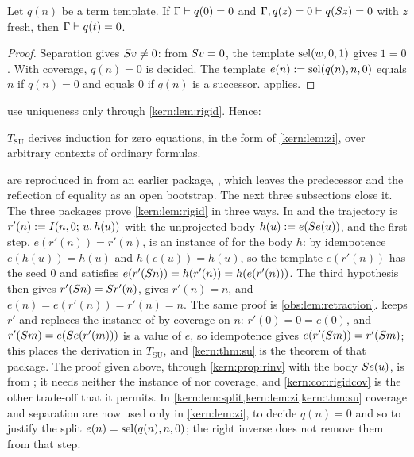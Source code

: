 \begin{lemma}
\label{kern:lem:zi}
Let $q(n)$ be a term template.  If $\Gamma\vdash q(0)=0$ and
$\Gamma,q(z)=0\vdash q(S z)=0$ with $z$ fresh, then
$\Gamma\vdash q(t)=0$.
\end{lemma}

\begin{proof}
Separation gives $S v\neq 0$: from $S v=0$, the template
$\operatorname{sel}(w,0,1)$ gives $1=0$.  With coverage, $q(n)=0$ is decided.  The
template $e(n)\mathrel{:=}\operatorname{sel}(q(n),n,0)$ equals $n$ if $q(n)=0$ and equals $0$
if $q(n)$ is a successor.   applies.
\end{proof}

 use uniqueness only through
\cref{kern:lem:rigid}.  Hence:

\begin{theorem}
\label{kern:thm:su}
$T_{\mathrm{SU}}$ derives induction for zero equations, in the form of
\cref{kern:lem:zi}, over arbitrary contexts of ordinary formulas.
\end{theorem}

\begin{remark}[Sources]
\label{kern:rem:scopekernel}
 are reproduced in
 from an earlier package, , which
leaves the predecessor and the reflection of equality as an open bootstrap.
The next three subsections close it.  The three packages prove
\cref{kern:lem:rigid} in three ways.  In  and
 the trajectory is $r'(n)\mathrel{:=}I(n,0;\,u.\,h(u))$
with the unprojected body $h(u)\mathrel{:=} e(S e(u))$, and the first step,
$e(r'(n))=r'(n)$, is an instance of  for the body $h$: by
idempotence $e(h(u))=h(u)$ and $h(e(u))=h(u)$, so the template $e(r'(n))$
has the seed $0$ and satisfies $e(r'(S n))=h(r'(n))=h(e(r'(n)))$.  The
third hypothesis then gives $r'(S n)=S r'(n)$,  gives
$r'(n)=n$, and $e(n)=e(r'(n))=r'(n)=n$.  The same proof is
\cref{obs:lem:retraction}.   keeps $r'$ and replaces the
instance of  by coverage on $n$: $r'(0)=0=e(0)$, and
$r'(S m)=e(S e(r'(m)))$ is a value of $e$, so idempotence gives
$e(r'(S m))=r'(S m)$; this places the derivation in $T_{\mathrm{SU}}$,
and \cref{kern:thm:su} is the theorem of that package.  The proof given
above, through \cref{kern:prop:rinv} with the body $S e(u)$, is from
; it needs neither the instance of  nor
coverage, and \cref{kern:cor:rigidcov} is the other trade-off that it
permits.  In \cref{kern:lem:split,kern:lem:zi,kern:thm:su} coverage and
separation are now used only in \cref{kern:lem:zi}, to decide $q(n)=0$ and
so to justify the split $e(n)=\operatorname{sel}(q(n),n,0)$; the right inverse does not
remove them from that step.
\end{remark}

